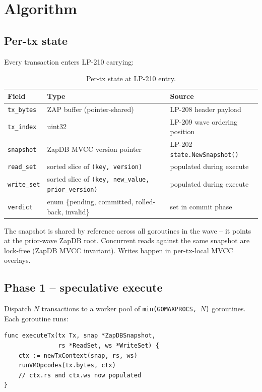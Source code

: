 \section{Algorithm}

\subsection{Per-tx state}

Every transaction enters LP-210 carrying:

\begin{table}[h]
\centering
\small
\begin{tabular}{@{}lll@{}}
\toprule
\textbf{Field} & \textbf{Type} & \textbf{Source} \\
\midrule
\texttt{tx\_bytes} & ZAP buffer (pointer-shared) & LP-208 header payload \\
\texttt{tx\_index} & uint32 & LP-209 wave ordering position \\
\texttt{snapshot} & ZapDB MVCC version pointer & LP-202 \texttt{state.NewSnapshot()} \\
\texttt{read\_set} & sorted slice of \texttt{(key, version)} & populated during execute \\
\texttt{write\_set} & sorted slice of \texttt{(key, new\_value, prior\_version)} & populated during execute \\
\texttt{verdict} & enum \{pending, committed, rolled-back, invalid\} & set in commit phase \\
\bottomrule
\end{tabular}
\caption{Per-tx state at LP-210 entry.}
\label{tab:pertx}
\end{table}

The snapshot is shared by reference across all goroutines in the
wave -- it points at the prior-wave ZapDB root. Concurrent reads
against the same snapshot are lock-free (ZapDB MVCC invariant).
Writes happen in per-tx-local MVCC overlays.

\subsection{Phase 1 -- speculative execute}

Dispatch $N$ transactions to a worker pool of
\texttt{min(GOMAXPROCS, $N$)} goroutines. Each goroutine runs:

\begin{verbatim}
func executeTx(tx Tx, snap *ZapDBSnapshot,
               rs *ReadSet, ws *WriteSet) {
    ctx := newTxContext(snap, rs, ws)
    runVMOpcodes(tx.bytes, ctx)
    // ctx.rs and ctx.ws now populated
}
\end{verbatim}

